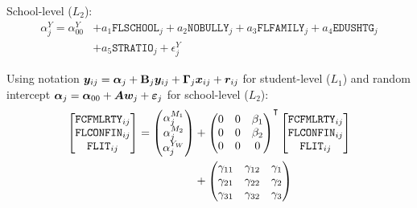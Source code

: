 \documentclass[a4paper,11pt,UKenglish,twoside,openright]{report}\usepackage[]{graphicx}\usepackage[]{color}
\begin{document}
School-level ($L_2$):
\begin{equation}
    \begin{aligned}
        \alpha^{Y}_{j} = \alpha^Y_{00} &+ a_1\texttt{FLSCHOOL}_j + a_2\texttt{NOBULLY}_j + a_3\texttt{FLFAMILY}_j + a_4\texttt{EDUSHTG}_j\\
        &+ a_5\texttt{STRATIO}_j + \epsilon^{Y}_j
    \end{aligned}
\end{equation}

Using  notation $\boldsymbol{y}_{ij} = \boldsymbol{\alpha}_j + \boldsymbol{\mathrm{B}}_j\boldsymbol{y}_{ij} + \boldsymbol{\Gamma}_j\boldsymbol{x}_{ij} + \boldsymbol{r}_{ij}$ for student-level ($L_1$) and random intercept $\boldsymbol{\alpha}_{j} = \boldsymbol{\alpha}_{00} + \boldsymbol{A}\boldsymbol{w}_j + \boldsymbol{\varepsilon}_j$ for school-level ($L_2$):
\begin{equation}
    \begin{aligned}
        \begin{bmatrix}
            \texttt{FCFMLRTY}_{ij}\\
            \texttt{FLCONFIN}_{ij}\\
            \texttt{FLIT}_{ij}
        \end{bmatrix} =
        \begin{pmatrix}
            \alpha^{M_1}_{j}\\
            \alpha^{M_2}_{j}\\
            \alpha^{Y_W}_{j}\\
        \end{pmatrix} &+
        \begin{pmatrix}
            0   &0  &\beta_1\\
            0   &0  &\beta_2\\
            0   &0  &0\\
        \end{pmatrix}\Ts
        \begin{bmatrix}
            \texttt{FCFMLRTY}_{ij}\\
            \texttt{FLCONFIN}_{ij}\\
            \texttt{FLIT}_{ij}
        \end{bmatrix}\\
        &+
        \begin{pmatrix}
            \gamma_{11}  &\gamma_{12}   &\gamma_1\\
            \gamma_{21}  &\gamma_{22}   &\gamma_2\\
            \gamma_{31}  &\gamma_{32}   &\gamma_3\\

\end{pmatrix}
\end{aligned}
\end{equation}
\end{document}
